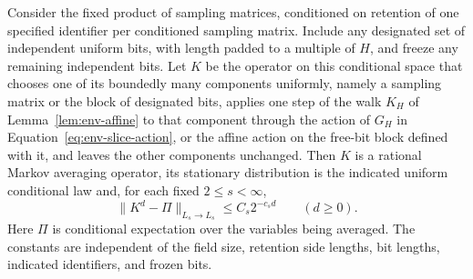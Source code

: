 \begin{lemma}\label{lem:env-gap}
Consider the fixed product of sampling matrices, conditioned on retention of
one specified identifier per conditioned sampling matrix. Include any designated
set of independent uniform bits, with length padded to a multiple of
$H$, and freeze any remaining independent bits.
Let $K$ be the operator on this conditional space that chooses one of
its boundedly many components uniformly, namely a sampling matrix or the block
of designated bits, applies one step of the walk $K_H$ of
Lemma~\ref{lem:env-affine} to that component through the action of
$G_H$ in Equation~\eqref{eq:env-slice-action}, or the affine action on
the free-bit block defined with it, and leaves the other
components unchanged. Then $K$ is a rational Markov averaging operator,
its stationary distribution is the indicated uniform conditional law
and, for each fixed $2\le s<\infty$,
\[
\|K^d-\Pi\|_{L_s\to L_s}\le C_s2^{-c_sd}
\qquad(d\ge0).
\]
Here $\Pi$ is conditional expectation over the variables being averaged.
The constants are independent of the field size, retention side
lengths, bit lengths, indicated identifiers, and frozen bits.
\end{lemma}

